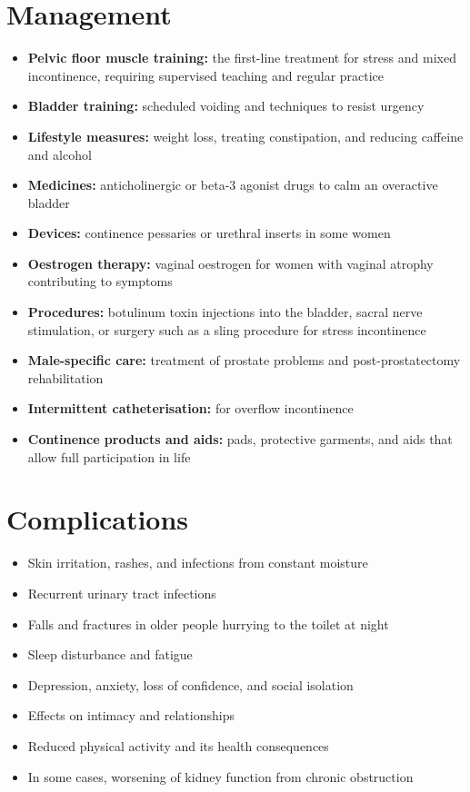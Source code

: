\section*{Management}
\begin{itemize}
    \item \textbf{Pelvic floor muscle training:} the first-line treatment for stress and mixed incontinence, requiring supervised teaching and regular practice
    \item \textbf{Bladder training:} scheduled voiding and techniques to resist urgency
    \item \textbf{Lifestyle measures:} weight loss, treating constipation, and reducing caffeine and alcohol
    \item \textbf{Medicines:} anticholinergic or beta-3 agonist drugs to calm an overactive bladder
    \item \textbf{Devices:} continence pessaries or urethral inserts in some women
    \item \textbf{Oestrogen therapy:} vaginal oestrogen for women with vaginal atrophy contributing to symptoms
    \item \textbf{Procedures:} botulinum toxin injections into the bladder, sacral nerve stimulation, or surgery such as a sling procedure for stress incontinence
    \item \textbf{Male-specific care:} treatment of prostate problems and post-prostatectomy rehabilitation
    \item \textbf{Intermittent catheterisation:} for overflow incontinence
    \item \textbf{Continence products and aids:} pads, protective garments, and aids that allow full participation in life
\end{itemize}

\section*{Complications}
\begin{itemize}
    \item Skin irritation, rashes, and infections from constant moisture
    \item Recurrent urinary tract infections
    \item Falls and fractures in older people hurrying to the toilet at night
    \item Sleep disturbance and fatigue
    \item Depression, anxiety, loss of confidence, and social isolation
    \item Effects on intimacy and relationships
    \item Reduced physical activity and its health consequences
    \item In some cases, worsening of kidney function from chronic obstruction
\end{itemize}

